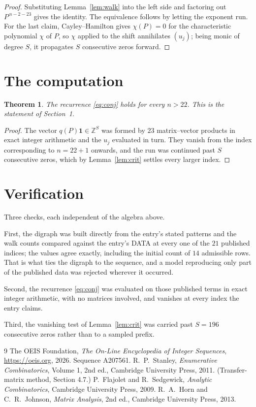 \documentclass[11pt,a4paper]{article}
\theoremstyle{plain}
\newtheorem{theorem}{Theorem}
\theoremstyle{definition}
\begin{document}
\begin{proof}
Substituting Lemma~\ref{lem:walk} into the left side and factoring out
$P^{\,n-2-23}$ gives the identity. The equivalence follows by letting the exponent
run. For the last claim, Cayley--Hamilton gives $\chi(P)=0$ for the characteristic
polynomial $\chi$ of $P$, so $\chi$ applied to the shift annihilates $(u_j)$; being monic of
degree $S$, it propagates $S$ consecutive zeros forward.
\end{proof}

\section{The computation}

\begin{theorem}
The recurrence \eqref{eq:conj} holds for every $n>22$. This is the statement of
Section~1.
\end{theorem}

\begin{proof}
The vector $q(P)\mathbf{1}\in\mathbb{Z}^{S}$ was formed by $23$ matrix--vector
products in exact integer arithmetic and the $u_j$ evaluated in turn. They vanish from the
index corresponding to $n=22+1$ onwards, and the run was continued past $S$ consecutive
zeros, which by Lemma~\ref{lem:crit} settles every larger index.
\end{proof}

\section{Verification}

Three checks, each independent of the algebra above.

First, the digraph was built directly from the entry's stated patterns and the walk counts
compared against the entry's DATA at every one of the $21$ published indices; the
values agree exactly, including the initial count of $14$ admissible rows. That is
what ties the digraph to the sequence, and a model reproducing only part of the published
data was rejected wherever it occurred.

Second, the recurrence \eqref{eq:conj} was evaluated on those published terms in exact
integer arithmetic, with no matrices involved, and vanishes at every index the entry claims.

Third, the vanishing test of Lemma~\ref{lem:crit} was carried past $S=196$ consecutive
zeros rather than to a sampled prefix.

\begin{thebibliography}{9}
 The OEIS Foundation, \emph{The On-Line Encyclopedia of Integer
Sequences}, \url{https://oeis.org}, 2026. Sequence A207561.
 R.~P.~Stanley, \emph{Enumerative Combinatorics}, Volume 1, 2nd ed.,
Cambridge University Press, 2011. (Transfer-matrix method, Section 4.7.)
 P.~Flajolet and R.~Sedgewick, \emph{Analytic Combinatorics}, Cambridge
University Press, 2009.
 R.~A.~Horn and C.~R.~Johnson, \emph{Matrix Analysis}, 2nd ed., Cambridge
University Press, 2013.
\end{thebibliography}
\end{document}
